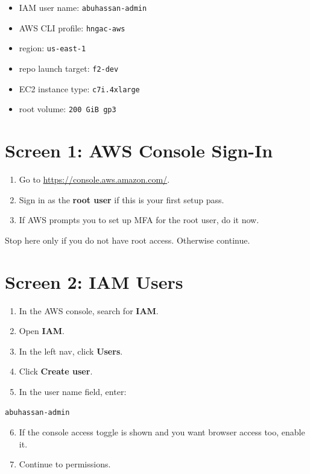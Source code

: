 \documentclass[11pt]{article}
\begin{document}
\begin{itemize}
\item IAM user name: \texttt{abuhassan-admin}
\item AWS CLI profile: \texttt{hngac-aws}
\item region: \texttt{us-east-1}
\item repo launch target: \texttt{f2-dev}
\item EC2 instance type: \texttt{c7i.4xlarge}
\item root volume: \texttt{200 GiB gp3}
\end{itemize}

\section*{Screen 1: AWS Console Sign-In}

\begin{enumerate}
\item Go to \url{https://console.aws.amazon.com/}.
\item Sign in as the \textbf{root user} if this is your first setup pass.
\item If AWS prompts you to set up MFA for the root user, do it now.
\end{enumerate}

Stop here only if you do not have root access. Otherwise continue.

\section*{Screen 2: IAM Users}

\begin{enumerate}
\item In the AWS console, search for \textbf{IAM}.
\item Open \textbf{IAM}.
\item In the left nav, click \textbf{Users}.
\item Click \textbf{Create user}.
\item In the user name field, enter:
\end{enumerate}

\begin{verbatim}
abuhassan-admin
\end{verbatim}

\begin{enumerate}
\setcounter{enumi}{5}
\item If the console access toggle is shown and you want browser access too, enable it.
\item Continue to permissions.
\end{enumerate}
\end{document}
